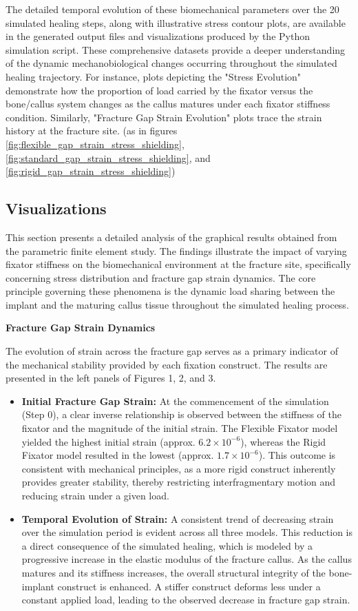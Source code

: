 \documentclass{article}
\begin{document}
The detailed temporal evolution of these biomechanical parameters over the 20 simulated healing steps, along with illustrative stress contour plots, are available in the generated output files and visualizations produced by the Python simulation script. These comprehensive datasets provide a deeper understanding of the dynamic mechanobiological changes occurring throughout the simulated healing trajectory. For instance, plots depicting the "Stress Evolution" demonstrate how the proportion of load carried by the fixator versus the bone/callus system changes as the callus matures under each fixator stiffness condition. Similarly, "Fracture Gap Strain Evolution" plots trace the strain history at the fracture site. (as in figures \ref{fig:flexible_gap_strain_stress_shielding}, \ref{fig:standard_gap_strain_stress_shielding}, and \ref{fig:rigid_gap_strain_stress_shielding})

\subsection{Visualizations}
This section presents a detailed analysis of the graphical results obtained from the parametric finite element study. The findings illustrate the impact of varying fixator stiffness on the biomechanical environment at the fracture site, specifically concerning stress distribution and fracture gap strain dynamics. The core principle governing these phenomena is the dynamic load sharing between the implant and the maturing callus tissue throughout the simulated healing process.

\textbf{Fracture Gap Strain Dynamics}

The evolution of strain across the fracture gap serves as a primary indicator of the mechanical stability provided by each fixation construct. The results are presented in the left panels of Figures 1, 2, and 3.

\begin{itemize}
    \item \textbf{Initial Fracture Gap Strain:} At the commencement of the simulation (Step 0), a clear inverse relationship is observed between the stiffness of the fixator and the magnitude of the initial strain. The Flexible Fixator model yielded the highest initial strain (approx. $6.2 \times 10^{-6}$), whereas the Rigid Fixator model resulted in the lowest (approx. $1.7 \times 10^{-6}$). This outcome is consistent with mechanical principles, as a more rigid construct inherently provides greater stability, thereby restricting interfragmentary motion and reducing strain under a given load.

    \item \textbf{Temporal Evolution of Strain:} A consistent trend of decreasing strain over the simulation period is evident across all three models. This reduction is a direct consequence of the simulated healing, which is modeled by a progressive increase in the elastic modulus of the fracture callus. As the callus matures and its stiffness increases, the overall structural integrity of the bone-implant construct is enhanced. A stiffer construct deforms less under a constant applied load, leading to the observed decrease in fracture gap strain.
\end{itemize}
\end{document}
